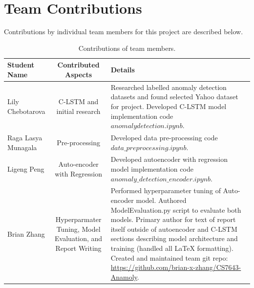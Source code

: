 \documentclass[10pt,twocolumn,letterpaper]{article}
\begin{document}

\section{Team Contributions}
Contributions by individual team members for this project are described below. 

\begin{table}
\begin{tabular}{|l|c|p{6cm}|}
\hline
Student Name & Contributed Aspects & Details \\
\hline\hline
Lily Chebotarova            & C-LSTM and initial research  & Researched labelled anomaly detection datasets and found selected Yahoo dataset for project. Developed C-LSTM model implementation code \(anomalydetection.ipynb\). \\ \hline 
Raga Lasya Munagala         & Pre-processing & Developed data pre-processing code \(data\_preprocessing.ipynb\). \\ \hline
Ligeng Peng                 & Auto-encoder with Regression  & Developed autoencoder with regression model implementation code \(anomaly\_detection\_encoder.ipynb\). \\ \hline
Brian Zhang                 & Hyperparmater Tuning, Model Evaluation, and Report Writing  & Performed hyperparameter tuning of Auto-encoder model. Authored ModelEvaluation.py script to evaluate both models. Primary author for text of report itself outside of autoencoder and C-LSTM sections describing model architecture and training (handled all LaTeX formatting). Created and maintained team git repo: \url{https://github.com/brian-x-zhang/CS7643-Anamoly}. \\ \hline
\hline
\end{tabular}
\caption{Contributions of team members.}
\label{tab:contributions}
\end{table}




{\small


}
\end{document}
